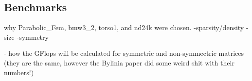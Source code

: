 \subsection{Benchmarks}\label{sec:dspmv-benchmarks}
why Parabolic\_Fem, bmw3\_2, torso1, and nd24k were chosen.
	-sparsity/density
	-size
	-symmetry

- how the GFlops will be calculated for symmetric and non-symmectric matrices (they are the same, however the Bylinia paper did some weird shit with their numbers!)